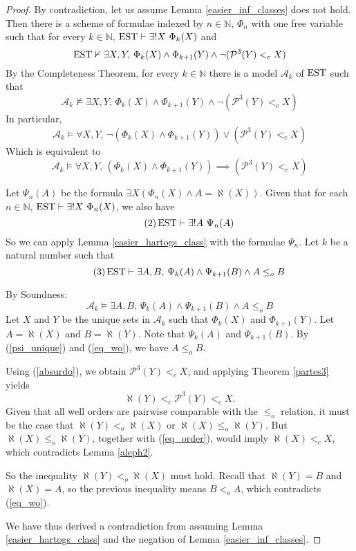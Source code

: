 \begin{proof}
	By contradiction, let us assume Lemma \ref{easier_inf_classes} does not hold. Then there is a scheme of formulae indexed by $n\in\mathbb{N}$, $\Phi_n$ with one free variable such that for every $k\in\mathbb{N}$, $\operatorname{EST} \vdash \exists! X \ \Phi_k (X)$ and
	\[
		\operatorname{EST} \nvdash \exists X,Y ,\, \Phi_k (X) \land \Phi_{k+1} (Y) \land \neg(\mathcal{P}^{3}(Y) <_c X)
	\]
	By the Completeness Theorem, for every $k\in\mathbb{N}$ there is a model $\mathcal{A}_k$ of $\operatorname{EST}$ such that
	\[
		\mathcal{A}_k \nvDash \exists X,Y ,\, \Phi_k (X) \land \Phi_{k+1} (Y) \land \neg(\mathcal{P}^{3}(Y) <_c X)
	\]
	In particular,
	\[
		\mathcal{A}_k \vDash \forall X,Y ,\, \neg (\Phi_k (X) \land \Phi_{k+1} (Y)) \lor (\mathcal{P}^{3}(Y) <_c X)
	\]
	Which is equivalent to
	\begin{equation}\tag{1}
		\label{absurdo}
		\mathcal{A}_k \vDash \forall X,Y , \, (\Phi_k (X) \land \Phi_{k+1} (Y)) \implies (\mathcal{P}^{3}(Y) <_c X)
	\end{equation}

	Let $\Psi_n (A)$ be the formula $\exists X (\Phi_n (X) \land A = \aleph(X))$.
	Given that for each $n\in\mathbb{N}$, $\operatorname{EST} \vdash \exists! X \ \Phi_n (X)$, we also have 
	\begin{equation}\tag{2}
		\label{psi_unique}
		\operatorname{EST} \vdash \exists! A \ \Psi_n (A)
	\end{equation}
	So we can apply Lemma \ref{easier_hartogs_class} with the formulae $\Psi_n$. Let $k$ be a natural number such that 
	\begin{equation}\tag{3}
		\label{eq_wo}
		\operatorname{EST} \vdash \exists A,B, \, \Psi_k (A) \land \Psi_{k+1} (B) \land A \leq_o B
	\end{equation}

	By Soundness:	
	\[
		\mathcal{A}_k \vDash \exists A,B, \, \Psi_k (A) \land \Psi_{k+1} (B) \land A \leq_o B
	\]	
	Let $X$ and $Y$ be the unique sets in $\mathcal{A}_k$ such that $\Phi_k (X)$ and $\Phi_{k+1} (Y)$. Let $A = \aleph(X)$ and $B = \aleph(Y)$.
	Note that $\Psi_k (A)$ and $\Psi_{k+1} (B)$. By (\ref{psi_unique}) and (\ref{eq_wo}), we have $A \leq_o B$.

	Using (\ref{absurdo}), we obtain $\mathcal{P}^{3}(Y) <_c X$; and applying Theorem \ref{partes3} yields
	\begin{equation}\tag{4}
		\label{eq_order}
		\aleph(Y) <_c \mathcal{P}^{3} (Y) <_c X. 
	\end{equation}
	Given that all well orders are pairwise comparable with the $\leq_o$ relation, it must be the case that $\aleph(Y) <_o \aleph(X)$ or $\aleph(X) \leq_o \aleph(Y)$.
	But $\aleph(X) \leq_o \aleph(Y)$, together with (\ref{eq_order}), would imply $\aleph(X) <_c X$, which contradicts Lemma \ref{aleph2}.
	
	So the inequality $\aleph(Y) <_o \aleph(X)$  must hold. Recall that $\aleph(Y) = B$ and $\aleph(X) = A$, so the previous inequality means $B <_o A$, which contradicts (\ref{eq_wo}).
	
	We have thus derived a contradiction from assuming Lemma \ref{easier_hartogs_class} and the negation of Lemma \ref{easier_inf_classes}.
\end{proof}


